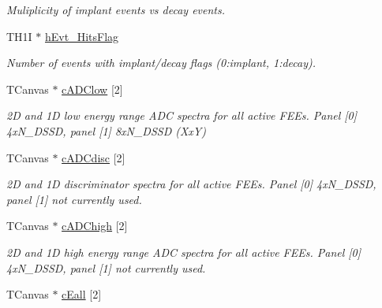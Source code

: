 \begin{DoxyCompactItemize}
\begin{DoxyCompactList}\small\item\em Muliplicity of implant events vs decay events. \end{DoxyCompactList}\item 
\hypertarget{classAnalysis_acfb01d96c26c1c18d373a523f4ad04f7}{T\-H1\-I $\ast$ \hyperlink{classAnalysis_acfb01d96c26c1c18d373a523f4ad04f7}{h\-Evt\-\_\-\-Hits\-Flag}}\label{classAnalysis_acfb01d96c26c1c18d373a523f4ad04f7}

\begin{DoxyCompactList}\small\item\em Number of events with implant/decay flags (0\-:implant, 1\-:decay). \end{DoxyCompactList}\item 
\hypertarget{classAnalysis_ad4de7701cca2bfd832a05b3b9fbfa182}{T\-Canvas $\ast$ \hyperlink{classAnalysis_ad4de7701cca2bfd832a05b3b9fbfa182}{c\-A\-D\-Clow} \mbox{[}2\mbox{]}}\label{classAnalysis_ad4de7701cca2bfd832a05b3b9fbfa182}

\begin{DoxyCompactList}\small\item\em 2\-D and 1\-D low energy range A\-D\-C spectra for all active F\-E\-Es. Panel \mbox{[}0\mbox{]} 4x\-N\-\_\-\-D\-S\-S\-D, panel \mbox{[}1\mbox{]} 8x\-N\-\_\-\-D\-S\-S\-D (Xx\-Y) \end{DoxyCompactList}\item 
\hypertarget{classAnalysis_a45f223024ad9306a6774bcb8a7fa6c4b}{T\-Canvas $\ast$ \hyperlink{classAnalysis_a45f223024ad9306a6774bcb8a7fa6c4b}{c\-A\-D\-Cdisc} \mbox{[}2\mbox{]}}\label{classAnalysis_a45f223024ad9306a6774bcb8a7fa6c4b}

\begin{DoxyCompactList}\small\item\em 2\-D and 1\-D discriminator spectra for all active F\-E\-Es. Panel \mbox{[}0\mbox{]} 4x\-N\-\_\-\-D\-S\-S\-D, panel \mbox{[}1\mbox{]} not currently used. \end{DoxyCompactList}\item 
\hypertarget{classAnalysis_a87e12a3a36995ef48e26beb28fc3b453}{T\-Canvas $\ast$ \hyperlink{classAnalysis_a87e12a3a36995ef48e26beb28fc3b453}{c\-A\-D\-Chigh} \mbox{[}2\mbox{]}}\label{classAnalysis_a87e12a3a36995ef48e26beb28fc3b453}

\begin{DoxyCompactList}\small\item\em 2\-D and 1\-D high energy range A\-D\-C spectra for all active F\-E\-Es. Panel \mbox{[}0\mbox{]} 4x\-N\-\_\-\-D\-S\-S\-D, panel \mbox{[}1\mbox{]} not currently used. \end{DoxyCompactList}\item 
\hypertarget{classAnalysis_a55f45fec31490ee8a3efcdbe882e93a3}{T\-Canvas $\ast$ \hyperlink{classAnalysis_a55f45fec31490ee8a3efcdbe882e93a3}{c\-Eall} \mbox{[}2\mbox{]}}\label{classAnalysis_a55f45fec31490ee8a3efcdbe882e93a3}


\end{DoxyCompactItemize}
